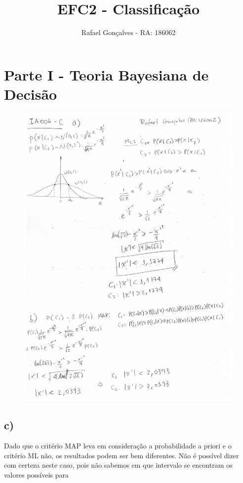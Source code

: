 \documentclass[a4paper, 12pt]{article}
\title{EFC2 - Classificação}
\author{Rafael Gonçalves - RA: 186062}
\date{}
\begin{document}
\maketitle

\section*{Parte I - Teoria Bayesiana de Decisão}

\begin{figure}[h!]
    \centering
    \includegraphics[width=1.0\textwidth]{images/parteI.png}
\end{figure}

\subsection*{c)}

Dado que o critério MAP leva em consideração a probabilidade a priori e o critério ML não, os resultados podem ser bem diferentes. Não é possível dizer com certeza neste caso, pois não sabemos em que intervalo se encontram os valores possíveis para 
\end{document}
